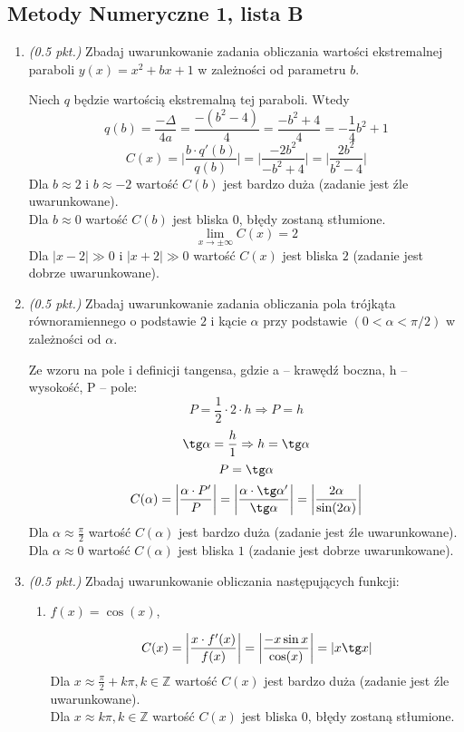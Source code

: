 \documentclass[12pt]{article}
\newcommand{\Z}{\mathbb{Z}}
\newenvironment{lista}[2][]{\newpage
\begin{center}
    \section[Lista \textbf{#2}]{Metody Numeryczne 1, lista #2}
\end{center}
\bigskip
#1
\begin{enumerate}[label=\textbf{#2\arabic*.}]}{\end{enumerate}}
\newcommand{\zad}[1][0.5]{\item \emph{(#1 pkt.) }}
\begin{document}
\begin{lista}{B}
    \zad Zbadaj uwarunkowanie zadania obliczania wartości ekstremalnej paraboli $y(x) = x^2 + bx + 1$ w zależności od parametru $b$.

    \begin{mdframed}
        Niech $q$ będzie wartością ekstremalną tej paraboli. Wtedy
        \[ q(b) = \frac{-\Delta}{4a} = \frac{-(b^2-4)}{4} = \frac{-b^2+4}{4} = -\frac{1}{4}b^2 + 1 \]
        \[ C(x) = \biggl|\frac{b\cdot q'(b)}{q(b)}\biggr| = \biggl|\frac{-2b^2}{-b^2+4}\biggr| = \biggl|\frac{2b^2}{b^2-4}\biggr| \]
        Dla $b \approx 2$ i $b \approx -2$ wartość $C(b)$ jest bardzo duża (zadanie jest źle uwarunkowane).\\
        Dla $b \approx 0$ wartość $C(b)$ jest bliska $0$, błędy zostaną stłumione.
        \[ \lim_{x\to\pm\infty} C(x) = 2\]
        Dla $|x - 2| \gg 0$ i $|x + 2| \gg 0$ wartość $C(x)$ jest bliska $2$ (zadanie jest dobrze uwarunkowane).
    \end{mdframed}

    \zad Zbadaj uwarunkowanie zadania obliczania pola trójkąta równoramiennego o podstawie $2$ i kącie $\alpha$ przy podstawie $(0 < \alpha < \pi/2)$ w zależności od $\alpha$.

    \begin{mdframed}
        Ze wzoru na pole i definicji tangensa, gdzie a -- krawędź boczna, h -- wysokość, P -- pole:
        \[ P = \frac{1}{2}\cdot2\cdot h \Rightarrow P = h \]
        \[ \tg \alpha = \frac{h}{1} \Rightarrow h = \tg \alpha \]
        \[ P = \tg \alpha \]
        \[ C(\alpha) = \biggl|\frac{\alpha\cdot P'}{P}\biggr| = \biggl|\frac{\alpha\cdot \tg \alpha'}{\tg \alpha}\biggr| = \biggl|\frac{2\alpha}{\sin(2\alpha)}\biggr| \]
        Dla $\alpha \approx \frac{\pi}{2}$ wartość $C(\alpha)$ jest bardzo duża (zadanie jest źle uwarunkowane).\\
        Dla $\alpha \approx 0$ wartość $C(\alpha)$ jest bliska $1$ (zadanie jest dobrze uwarunkowane).
    \end{mdframed}

    \zad Zbadaj uwarunkowanie obliczania następujących funkcji:
    \begin{enumerate}[wide, labelindent=0pt]
        \item $f(x) = \cos(x)$,

              \begin{mdframed}
                  \[ C(x) = \biggl|\frac{x\cdot f'(x)}{f(x)}\biggr| = \biggl|\frac{-x\sin x}{\cos(x)}\biggr| = |x\tg x| \]
                  Dla $x \approx \frac{\pi}{2} + k\pi, k\in\Z$ wartość $C(x)$ jest bardzo duża (zadanie jest źle uwarunkowane).\\
                  Dla $x \approx k\pi, k\in\Z$ wartość $C(x)$ jest bliska $0$, błędy zostaną stłumione.
              \end{mdframed}


\end{enumerate}
\end{lista}
\end{document}
